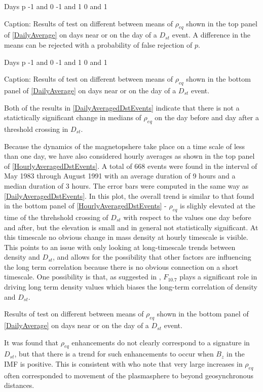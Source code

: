 \documentclass[10pt,twocolumn]{article}
\begin{document}
   Days     p
-1 and 0
-1 and 1
 0 and 1

Caption: Results of test on different between means of $\rho_{eq}$ shown in the top panel of \ref{DailyAverage} on days near or on the day of a $D_{st}$ event.  A difference in the means can be rejected with a probability of false rejection of $p$.

   Days     p
-1 and 0
-1 and 1
 0 and 1

Caption: Results of test on different between means of $\rho_{eq}$ shown in the bottom panel of \ref{DailyAverage} on days near or on the day of a $D_{st}$ event.  

Both of the results in \ref{DailyAveragedDstEvents} indicate that there is not a statictically significant change in medians of $\rho_{eq}$ on the day before and day after a threshold crossing in $D_{st}$.  

Because the dynamics of the magnetopshere take place on a time scale of less than one day, we have also considered hourly averages as shown in the top panel of \ref{HourlyAveragedDstEvents}.  A total of 668 events were found in the interval of May 1983 through August 1991 with an average duration of 9 hours and a median duration of 3 hours.  The error bars were computed in the same way as \ref{DailyAveragedDstEvents}.  In this plot, the overall trend is similar to that found in the bottom panel of \ref{HourlyAveragedDstEvents} - $\rho_{eq}$ is slighly elevated at the time of the threhshold crossing of $D_{st}$ with respect to the values one day before and after, but the elevation is small and in general not statistically significant.  At this timescale no obvious change in mass density at hourly timescale is visible. This points to an issue with only looking at long-timescale trends between density and $D_{st}$, and allows for the possibility that other factors are influencing the long term correlation because there is no obvious connection on a short timescale.  One possibility is that, as suggested in \cite{Takahashi2010}, $F_{10.7}$ plays a significant role in driving long term density values which biases the long-term correlation of density and $D_{st}$.

Results of test on different between means of $\rho_{eq}$ shown in the bottom panel of \ref{DailyAverage} on days near or on the day of a $D_{st}$ event.  

It was found that $\rho_{eq}$ enhancements do not clearly correspond to a signature in $D_{st}$, but that there is a trend for such enhancements to occur when $B_{z}$ in the IMF is positive.  This is consistent with \cite{Takahashi2010} who note that very large increases in $\rho_{eq}$ often corresponded to movement of the plasmasphere to beyond geosynchronous distances. 
\end{document}
